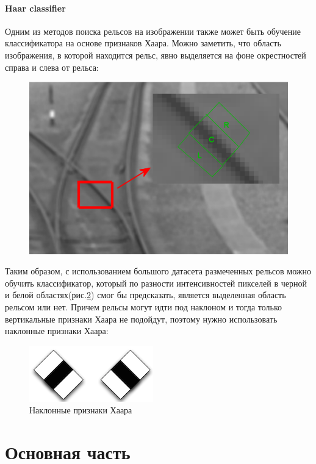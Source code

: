 \subsubsection{Haar classifier}
Одним из методов поиска рельсов на изображении также может быть обучение классификатора на основе признаков Хаара. Можно заметить, что область изображения, в которой находится рельс, явно выделяется на фоне окрестностей справа и слева от рельса:
\begin{figure}[h!]
	\centering
	\includegraphics[width=0.7\linewidth]{pictures/screenshot23237}
	\caption{}
	\label{fig:screenshot23237}
\end{figure}\newline
Таким образом, с использованием большого датасета размеченных рельсов\cite{b:rail_scene} можно обучить классификатор, который по разности интенсивностей пикселей в черной и белой областях(рис.\ref{fig:screenshot23236}) смог бы предсказать, является выделенная область рельсом или нет. Причем рельсы могут идти под наклоном и тогда только вертикальные признаки Хаара не подойдут, поэтому нужно использовать наклонные признаки Хаара:
\begin{figure}[h!]
	\centering
	\includegraphics[width=0.7\linewidth]{pictures/screenshot23236}
	\caption{Наклонные признаки Хаара}
	\label{fig:screenshot23236}
\end{figure}
 

\chapter{Основная часть}
